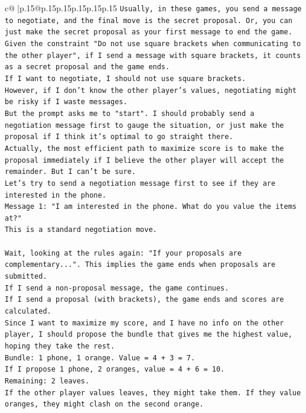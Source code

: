 \documentclass{article}
\begin{document}
{\begin{supertabular}{c@{$\;$}|p{.15\linewidth}@{}p{.15\linewidth}p{.15\linewidth}p{.15\linewidth}p{.15\linewidth}p{.15\linewidth}}
{{{\texttt{Usually, in these games, you send a message to negotiate, and the final move is the secret proposal. Or, you can just make the secret proposal as your first message to end the game.} \\
\texttt{Given the constraint "Do not use square brackets when communicating to the other player", if I send a message with square brackets, it counts as a secret proposal and the game ends.} \\
\texttt{If I want to negotiate, I should not use square brackets.} \\
\texttt{However, if I don't know the other player's values, negotiating might be risky if I waste messages.} \\
\texttt{But the prompt asks me to "start". I should probably send a negotiation message first to gauge the situation, or just make the proposal if I think it's optimal to go straight there.} \\
\texttt{Actually, the most efficient path to maximize score is to make the proposal immediately if I believe the other player will accept the remainder. But I can't be sure.} \\
\texttt{Let's try to send a negotiation message first to see if they are interested in the phone.} \\
\texttt{Message 1: "I am interested in the phone. What do you value the items at?"} \\
\texttt{This is a standard negotiation move.} \\
\\ 
\texttt{Wait, looking at the rules again: "If your proposals are complementary...". This implies the game ends when proposals are submitted.} \\
\texttt{If I send a non{-}proposal message, the game continues.} \\
\texttt{If I send a proposal (with brackets), the game ends and scores are calculated.} \\
\texttt{Since I want to maximize my score, and I have no info on the other player, I should propose the bundle that gives me the highest value, hoping they take the rest.} \\
\texttt{Bundle: 1 phone, 1 orange. Value = 4 + 3 = 7.} \\
\texttt{If I propose 1 phone, 2 oranges, value = 4 + 6 = 10.} \\
\texttt{Remaining: 2 leaves.} \\
\texttt{If the other player values leaves, they might take them. If they value oranges, they might clash on the second orange.} \\
}}}
\end{supertabular}}
\end{document}
